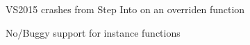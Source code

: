 
\begin{DoxyRefList}
\item[\label{bug__bug000001}%
\hypertarget{bug__bug000001}{}%
File \hyperlink{_event_master_8cs}{Event\+Master.cs} ]V\+S2015 crashes from \textquotesingle{}Step Into\textquotesingle{} on an overriden function 

No/\+Buggy support for instance functions
\end{DoxyRefList}